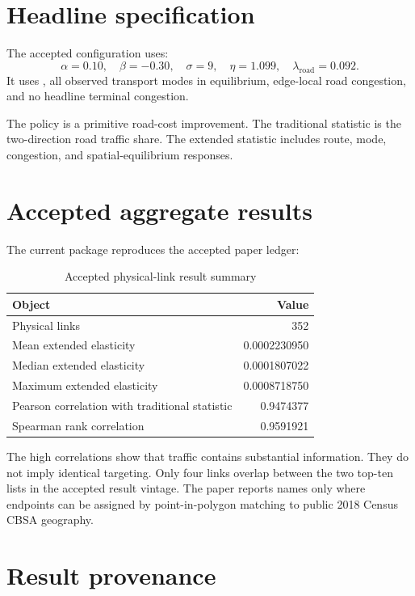 \section{Headline specification}

The accepted configuration uses:
\[
 \alpha=0.10,\quad \beta=-0.30,\quad \sigma=9,\quad
 \eta=1.099,\quad \lambda_{\mathrm{road}}=0.092.
\]
It uses , all observed transport modes in equilibrium,
edge-local road congestion, and no headline terminal congestion.

The policy is a primitive road-cost improvement. The traditional statistic is
the two-direction road traffic share. The extended statistic includes route,
mode, congestion, and spatial-equilibrium responses.

\section{Accepted aggregate results}

The current package reproduces the accepted paper ledger:
\begin{table}[H]
\centering
\caption{Accepted physical-link result summary}
\label{tab:rsue-summary}
\begin{tabular}{lr}
\toprule
Object & Value \\
\midrule
Physical links & 352 \\
Mean extended elasticity & 0.0002230950 \\
Median extended elasticity & 0.0001807022 \\
Maximum extended elasticity & 0.0008718750 \\
Pearson correlation with traditional statistic & 0.9474377 \\
Spearman rank correlation & 0.9591921 \\
\bottomrule
\end{tabular}
\end{table}

The high correlations show that traffic contains substantial information.
They do not imply identical targeting. Only four links overlap between the
two top-ten lists in the accepted result vintage. The paper reports names only
where endpoints can be assigned by point-in-polygon matching to public 2018
Census CBSA geography.

\section{Result provenance}

